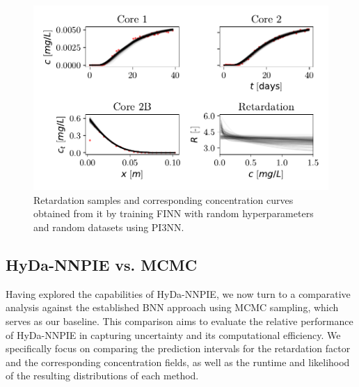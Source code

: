\begin{figure}[h]
    \centering
    \includegraphics{figs/finn_fullspan_samples.pdf}
    \caption{Retardation samples and corresponding concentration curves obtained from it by training FINN with random hyperparameters and random datasets using PI3NN.}
    \label{fig:fullspan_samples}
\end{figure}



\subsection{HyDa-NNPIE vs. MCMC}
Having explored the capabilities of HyDa-NNPIE, we now turn to a comparative analysis against the established BNN approach using MCMC sampling, which serves as our baseline. This comparison aims to evaluate the relative performance of HyDa-NNPIE in capturing uncertainty and its computational efficiency. We specifically focus on comparing the prediction intervals for the retardation factor and the corresponding concentration fields, as well as the runtime and likelihood of the resulting distributions of each method.

